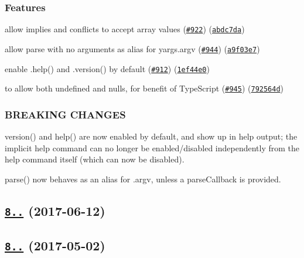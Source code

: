 \subsubsection*{Features}


\begin{DoxyItemize}
\item allow implies and conflicts to accept array values (\href{https://github.com/yargs/yargs/issues/922}{\tt \#922}) (\href{https://github.com/yargs/yargs/commit/abdc7da}{\tt abdc7da})
\item allow parse with no arguments as alias for yargs.\+argv (\href{https://github.com/yargs/yargs/issues/944}{\tt \#944}) (\href{https://github.com/yargs/yargs/commit/a9f03e7}{\tt a9f03e7})
\item enable .help() and .version() by default (\href{https://github.com/yargs/yargs/issues/912}{\tt \#912}) (\href{https://github.com/yargs/yargs/commit/1ef44e0}{\tt 1ef44e0})
\item to allow both undefined and nulls, for benefit of Type\+Script (\href{https://github.com/yargs/yargs/issues/945}{\tt \#945}) (\href{https://github.com/yargs/yargs/commit/792564d}{\tt 792564d})
\end{DoxyItemize}

\subsubsection*{B\+R\+E\+A\+K\+I\+NG C\+H\+A\+N\+G\+ES}


\begin{DoxyItemize}
\item version() and help() are now enabled by default, and show up in help output; the implicit help command can no longer be enabled/disabled independently from the help command itself (which can now be disabled).
\item parse() now behaves as an alias for .argv, unless a parse\+Callback is provided.
\end{DoxyItemize}

\label{_8.0.2}%
 \subsection*{\href{https://github.com/yargs/yargs/compare/v8.0.1...v8.0.2}{\tt 8..} (2017-\/06-\/12)}

\label{_8.0.1}%
 \subsection*{\href{https://github.com/yargs/yargs/compare/v8.0.0...v8.0.1}{\tt 8..} (2017-\/05-\/02)}

